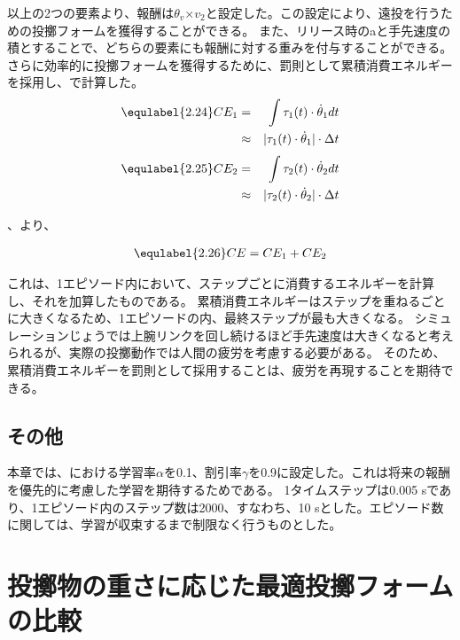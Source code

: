 以上の2つの要素より、報酬は$\theta_{v}$$\times$$v_{2}$と設定した。この設定により、遠投を行うための投擲フォームを獲得することができる。
また、リリース時のaと手先速度の積とすることで、どちらの要素にも報酬に対する重みを付与することができる。\\
さらに効率的に投擲フォームを獲得するために、罰則として累積消費エネルギーを採用し、で計算した。\\
\begin{eqnarray}
  \equlabel{2.24}
  CE_{1}&=&\int \tau_{1}(t)\cdot\dot{\theta}_{1} dt\\
        &\approx&|\tau_{1}(t)\cdot\dot{\theta}_{1}|\cdot\Delta t
\end{eqnarray}
\begin{eqnarray}
  \equlabel{2.25}
  CE_{2}&=&\int \tau_{2}(t)\cdot\dot{\theta}_{2} dt\\
        &\approx&|\tau_{2}(t)\cdot\dot{\theta}_{2}|\cdot\Delta t
\end{eqnarray}

、より、

\begin{eqnarray}
  \equlabel{2.26}
  CE=CE_{1}+CE_{2}
\end{eqnarray}

これは、1エピソード内において、ステップごとに消費するエネルギーを計算し、それを加算したものである。
累積消費エネルギーはステップを重ねるごとに大きくなるため、1エピソードの内、最終ステップが最も大きくなる。
シミュレーションじょうでは上腕リンクを回し続けるほど手先速度は大きくなると考えられるが、実際の投擲動作では人間の疲労を考慮する必要がある。
そのため、累積消費エネルギーを罰則として採用することは、疲労を再現することを期待できる。
\subsection{その他}
本章では、における学習率$\alpha$を0.1、割引率$\gamma$を0.9に設定した。これは将来の報酬を優先的に考慮した学習を期待するためである。
1タイムステップは0.005 sであり、1エピソード内のステップ数は2000、すなわち、10 sとした。エピソード数に関しては、学習が収束するまで制限なく行うものとした。
\section{投擲物の重さに応じた最適投擲フォームの比較}
